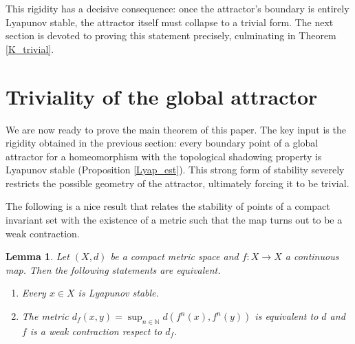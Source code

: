\documentclass{amsart}
\newtheorem{lemma}{Lemma}
\newcommand{\N}{{\mathbb{N}}}
\begin{document}
	This rigidity has a decisive consequence: once the attractor’s boundary is entirely Lyapunov stable, the attractor itself must collapse to a trivial form.  
	The next section is devoted to proving this statement precisely, culminating in Theorem \ref{K_trivial}. %
	
	\section{Triviality of the global attractor}\label{main_thm}
	
	We are now ready to prove the main theorem of this paper.  
	The key input is the rigidity obtained in the previous section: every boundary point of a global attractor for a homeomorphism with the topological shadowing property is Lyapunov stable (Proposition \ref{Lyap_est}).  
	This strong form of stability severely restricts the possible geometry of the attractor, ultimately forcing it to be trivial.
	
	The following is a nice result that relates the stability of points of a compact invariant set with the existence of a metric such that the map turns out to be a weak contraction.
	
	
	\begin{lemma} \cite[Theorem 2.1]{AAB96}\label{contr_debil}
		Let $(X,d)$ be a compact metric space and  $f:X\to X$ a continuous map. 
		Then the following statements are equivalent.
		\begin{enumerate}
			\item Every $x\in X$ is Lyapunov stable.
			\item The metric $d_f(x,y)=\sup_{n\in\N} d(f^n(x), f^n(y))$ is equivalent to   $d$ and $f$ is a weak  contraction respect to  $d_f$.
		\end{enumerate}
	\end{lemma}	
	
	
\end{document}
